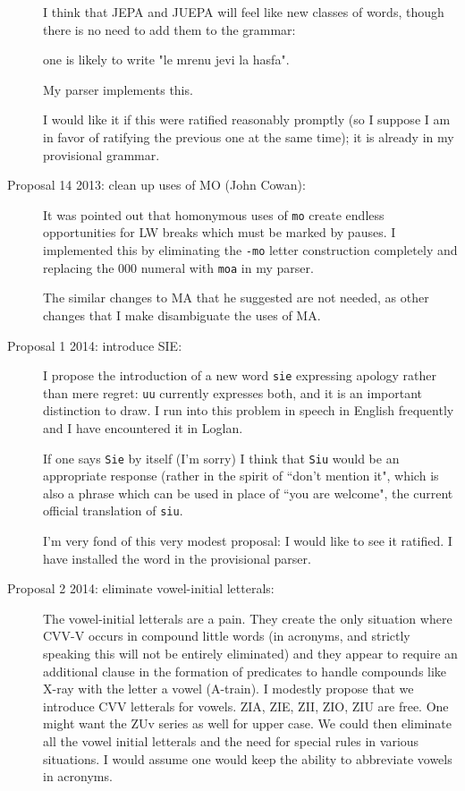 \documentclass[12pt]{article}
\begin{document}
\begin{description}
I think that JEPA and JUEPA will feel like 
new classes of words, though there is 
no need to add them to the grammar:

one is likely to write "le mrenu jevi la hasfa".

My parser implements this.

I would like it if this were ratified reasonably promptly (so I suppose I am in favor of ratifying the previous one at the same time);
it is already in my provisional grammar.


\item[Proposal 14 2013:  clean up uses of MO (John Cowan):]  It was pointed out that homonymous uses of 
{\tt mo} create endless opportunities for LW breaks which must be marked by pauses.  I implemented this by  eliminating the {\tt -mo} letter construction completely and replacing the 000 numeral with {\tt moa} in my parser.

The similar changes to MA that he suggested are not needed, as other changes that I make disambiguate the uses of MA.

\item[Proposal 1 2014:  introduce SIE:]  I propose the introduction of a new word {\tt sie} expressing apology rather than mere regret:
{\tt uu} currently expresses both, and it is an important distinction to draw.  I run into this problem in speech in 
English frequently and I have encountered it in Loglan.

If one says {\tt Sie} by itself (I'm sorry) I think that {\tt Siu} would be an appropriate response (rather in the spirit
of  ``don't mention it", which is also a phrase which can be used in place of ``you are welcome", the current official
translation of {\tt siu}.

I'm very fond of this very modest proposal:  I would like to see it ratified.  I have installed the word in the provisional parser.

\item[Proposal 2 2014:  eliminate vowel-initial letterals:]  The vowel-initial letterals are a pain.  They create the only situation
where CVV-V occurs in compound little words (in acronyms, and strictly speaking this will not be entirely eliminated)
and they appear to require an additional clause in the formation of predicates to handle compounds like
X-ray with the letter a vowel (A-train).   I modestly propose that we introduce CVV letterals for vowels.
ZIA, ZIE, ZII, ZIO, ZIU are free.  One might want the ZUv series as well for upper case.  We could then eliminate
all the vowel initial letterals and the need for special rules in various situations.  I would assume one would keep
the ability to abbreviate vowels in acronyms.


\end{description}
\end{document}
